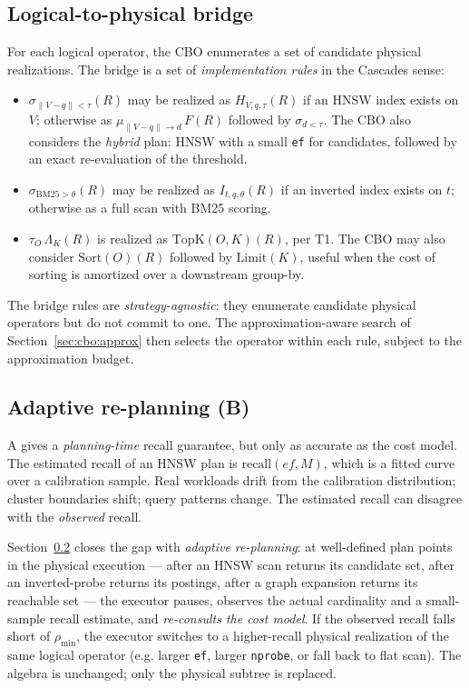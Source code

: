 \documentclass[sigconf,nonacm,review]{acmart}
\theoremstyle{plain}
\theoremstyle{definition}
\theoremstyle{remark}
\begin{document}
\subsection{Logical-to-physical bridge}

For each logical operator, the CBO enumerates a set of candidate
physical realizations. The bridge is a set of \emph{implementation
rules} in the Cascades sense:

\begin{itemize}[leftmargin=*]
  \item $\sigma_{\lVert V-q\rVert<\tau}(R)$ may be realized as
    $H_{V,q,\tau}(R)$ if an HNSW index exists on $V$; otherwise as
    $\mu_{\lVert V-q\rVert\to d}\, F(R)$ followed by
    $\sigma_{d<\tau}$. The CBO also considers the \emph{hybrid} plan:
    HNSW with a small \texttt{ef} for candidates, followed by an
    exact re-evaluation of the threshold.
  \item $\sigma_{\mathrm{BM25}>\theta}(R)$ may be realized as
    $I_{t,q,\theta}(R)$ if an inverted index exists on $t$; otherwise
    as a full scan with BM25 scoring.
  \item $\tau_O\, \Lambda_K(R)$ is realized as
    $\mathrm{TopK}(O, K)(R)$, per T1. The CBO may also consider
    $\mathrm{Sort}(O)(R)$ followed by $\mathrm{Limit}(K)$, useful
    when the cost of sorting is amortized over a downstream
    group-by.
\end{itemize}

The bridge rules are \emph{strategy-agnostic}: they enumerate
candidate physical operators but do not commit to one. The
approximation-aware search of Section~\ref{sec:cbo:approx} then
selects the operator within each rule, subject to the approximation
budget.

\subsection{Adaptive re-planning (B)}\label{sec:cbo:adaptive}

A gives a \emph{planning-time} recall guarantee, but only as accurate
as the cost model. The estimated recall of an HNSW plan is
$\mathrm{recall}(\mathit{ef}, M)$, which is a fitted curve over a
calibration sample. Real workloads drift from the calibration
distribution; cluster boundaries shift; query patterns change. The
estimated recall can disagree with the \emph{observed} recall.

Section~\ref{sec:cbo:adaptive} closes the gap with \emph{adaptive
re-planning}: at well-defined plan points in the physical
execution --- after an HNSW scan returns its candidate set, after
an inverted-probe returns its postings, after a graph expansion
returns its reachable set --- the executor pauses, observes the
actual cardinality and a small-sample recall estimate, and
\emph{re-consults the cost model}. If the observed recall falls
short of $\rho_{\min}$, the executor switches to a
higher-recall physical realization of the same logical operator
(e.g. larger \texttt{ef}, larger \texttt{nprobe}, or fall back to
flat scan). The algebra is unchanged; only the physical subtree
is replaced.
\end{document}
